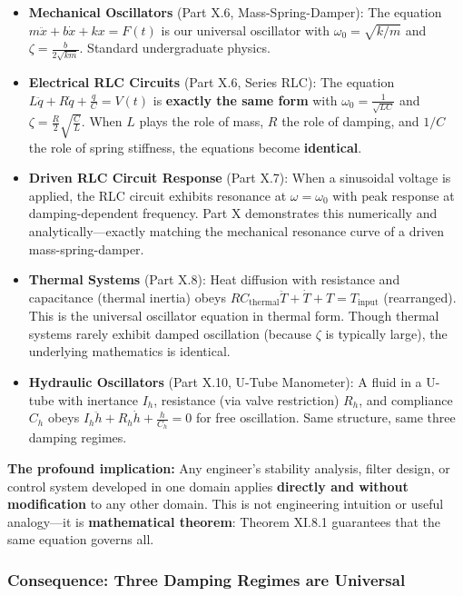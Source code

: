 \documentclass[
]{article}
\begin{document}
\begin{itemize}
\item
  \textbf{Mechanical Oscillators} (Part X.6, Mass-Spring-Damper): The
  equation \(m\ddot{x} + b\dot{x} + kx = F(t)\) is our universal
  oscillator with \(\omega_0 = \sqrt{k/m}\) and
  \(\zeta = \frac{b}{2\sqrt{km}}\). Standard undergraduate physics.
\item
  \textbf{Electrical RLC Circuits} (Part X.6, Series RLC): The equation
  \(L\ddot{q} + R\dot{q} + \frac{q}{C} = V(t)\) is \textbf{exactly the
  same form} with \(\omega_0 = \frac{1}{\sqrt{LC}}\) and
  \(\zeta = \frac{R}{2}\sqrt{\frac{C}{L}}\). When \(L\) plays the role
  of mass, \(R\) the role of damping, and \(1/C\) the role of spring
  stiffness, the equations become \textbf{identical}.
\item
  \textbf{Driven RLC Circuit Response} (Part X.7): When a sinusoidal
  voltage is applied, the RLC circuit exhibits resonance at
  \(\omega = \omega_0\) with peak response at damping-dependent
  frequency. Part X demonstrates this numerically and
  analytically---exactly matching the mechanical resonance curve of a
  driven mass-spring-damper.
\item
  \textbf{Thermal Systems} (Part X.8): Heat diffusion with resistance
  and capacitance (thermal inertia) obeys
  \(RC_{\text{thermal}}\ddot{T} + \dot{T} + T = T_{\text{input}}\)
  (rearranged). This is the universal oscillator equation in thermal
  form. Though thermal systems rarely exhibit damped oscillation
  (because \(\zeta\) is typically large), the underlying mathematics is
  identical.
\item
  \textbf{Hydraulic Oscillators} (Part X.10, U-Tube Manometer): A fluid
  in a U-tube with inertance \(I_h\), resistance (via valve restriction)
  \(R_h\), and compliance \(C_h\) obeys
  \(I_h\ddot{h} + R_h\dot{h} + \frac{h}{C_h} = 0\) for free oscillation.
  Same structure, same three damping regimes.
\end{itemize}

\textbf{The profound implication:} Any engineer's stability analysis,
filter design, or control system developed in one domain applies
\textbf{directly and without modification} to any other domain. This is
not engineering intuition or useful analogy---it is \textbf{mathematical
theorem}: Theorem XI.8.1 guarantees that the same equation governs all.

\subsubsection{Consequence: Three Damping Regimes are
Universal}\label{consequence-three-damping-regimes-are-universal}
\end{document}
